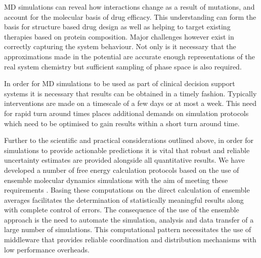 MD simulations can reveal how interactions change as a result of mutations, and account for the molecular basis of drug efficacy.
This understanding can form the basis for structure based drug design as well as helping to target existing therapies based on protein composition.
Major challenges however exist in correctly capturing the system behaviour.
Not only is it necessary that the approximations made in the potential are accurate enough representations of the real system chemistry but sufficient sampling of phase space is also required.

In order for MD simulations to be used as part of clinical decision support systems it is necessary that results can be obtained in a timely fashion.
Typically interventions are made on a timescale of a few days or at most a week.
This need for rapid turn around times places additional demands on simulation protocols which need to be optimised to gain results within a short turn around time.

Further to the scientific and practical considerations outlined above, in order for simulations to provide actionable predictions it is vital that robust and reliable uncertainty estimates are provided alongside all quantitative results.
We have developed a number of free energy calculation protocols based on the use of ensemble molecular dynamics simulations with the aim of meeting these requirements \cite{Sadiq2008, Sadiq2010, Wan2017brd4, Wan2017trk}.
Basing these computations on the direct calculation of ensemble averages facilitates the determination of statistically meaningful results along with complete control of errors.
The consequence of the use of the ensemble approach is the need to automate the simulation, analysis and data transfer of a large number of simulations.
This computational pattern necessitates the use of middleware that provides reliable coordination and distribution mechanisms with low performance overheads.

